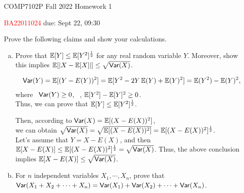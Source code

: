 



\noindent
\hspace*{.2in} COMP7102P Fall 2022
\hfill Homework 1\\
\begin{CJK}{UTF8}{gbsn}
\hspace*{.2in} \textcolor{red}{BA22011024 \Name{} \ChineseName} \hfill due: Sept 22, 09:30
\end{CJK}

\bigskip

\begin{problem}[30 points]
Prove the following claims and show your calculations.
\begin{enumerate}[(a)]
\item Prove that $\operatorname*{\mathbb{E}}[Y] \le \operatorname*{\mathbb{E}}[Y^2]^\frac{1}{2}$ for any real random variable $Y$. Moreover, show this implies $\operatorname*{\mathbb{E}}[|X - \operatorname*{\mathbb{E}}[X]|] \le \sqrt{\mathsf{Var}(X)}$.

\Answer
\begin{equation}
\begin{aligned}
\mathsf{Var}(Y) = \operatorname*{\mathbb{E}}[(Y - E(Y))^2] = \operatorname*{\mathbb{E}}[Y^2 - 2Y\operatorname*{\mathbb{E}}(Y) + \operatorname*{\mathbb{E}}(Y)^2] = \operatorname*{\mathbb{E}}(Y^2) - \operatorname*{\mathbb{E}}(Y)^2, \notag \\
\end{aligned}
\end{equation}
where \ $\mathsf{Var}(Y) \ge 0$, \ \ie,  $\operatorname*{\mathbb{E}}[Y^2] - \operatorname*{\mathbb{E}}[Y]^2 \ge 0$.   \\
Thus, we can prove that $\operatorname*{\mathbb{E}}[Y] \le \operatorname*{\mathbb{E}}[Y^2]^\frac{1}{2}$.

Then, according to $\mathsf{Var}(X) = \operatorname*{\mathbb{E}}[(X - E(X))^2]$, \\
we can obtain $\sqrt{\mathsf{Var}(X)} = \sqrt{\operatorname*{\mathbb{E}}[(X - E(X))^2]} = \operatorname*{\mathbb{E}}[(X - E(X))^2]^\frac{1}{2}$. \\
Let's assume that $Y = X - E(X)$, and then $\operatorname*{\mathbb{E}}[X - E(X)] \le \operatorname*{\mathbb{E}}[(X - E(X))^2]^\frac{1}{2} = \sqrt{\mathsf{Var}(X)}$.
Thus, the above conclusion implies $\operatorname*{\mathbb{E}}[X - E(X)] \le \sqrt{\mathsf{Var}(X)}$.


\item For $n$ independent variables $X_1, \cdots, X_n$, prove that $\mathsf{Var}(X_1 + X_2 + \cdots + X_n) = \mathsf{Var}(X_1) + \mathsf{Var}(X_2) + \cdots + \mathsf{Var}(X_n)$.

\Answer


\end{enumerate}
\end{problem}

